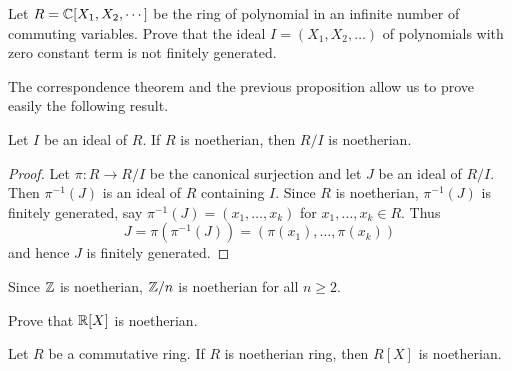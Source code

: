 \begin{exercise}
	Let $R=\mathbb{C}[X_1,X_2,\cdots]$ be the ring of polynomial in an infinite number of 
	commuting variables. Prove that the ideal $I=(X_1,X_2,\dots)$ of polynomials 
	with zero constant term is not finitely generated. 
\end{exercise}


The correspondence theorem and the previous proposition 
allow us to prove easily the following result. 

\begin{proposition}
	Let $I$ be an ideal of $R$. If $R$ is noetherian, then $R/I$ is noetherian.
\end{proposition}

\begin{proof}
	Let $\pi\colon R\to R/I$ be the canonical surjection and let $J$ be an ideal of $R/I$. 
	Then $\pi^{-1}(J)$ is an ideal of $R$ containing $I$. Since 
	$R$ is noetherian, $\pi^{-1}(J)$ is finitely generated, say 
	$\pi^{-1}(J)=(x_1,\dots,x_k)$ for $x_1,\dots,x_k\in R$. Thus 
	\[
	J=\pi(\pi^{-1}(J))=(\pi(x_1),\dots,\pi(x_k))
	\]
	and hence $J$ is finitely generated. 
\end{proof}

Since $\mathbb{Z}$ is noetherian, $\mathbb{Z}/n$ is noetherian for all $n\geq2$. 

\begin{exercise}
	Prove that $\mathbb{R}[X]$ is noetherian. 	
\end{exercise}


\begin{theorem}[Hilbert]
	Let $R$ be a commutative ring. If $R$ is noetherian ring, then $R[X]$ is noetherian.	
\end{theorem}

